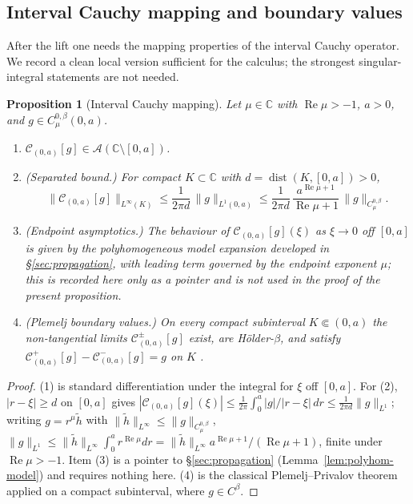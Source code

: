 \documentclass[pdflatex,sn-mathphys-num]{sn-jnl}%
\newcommand{\C}{\mathbb{C}}
\newcommand{\Cau}{\mathcal{C}}
\newcommand{\dist}{\operatorname{dist}}
\newcommand{\Real}{\operatorname{Re}}
\newcommand{\Ahol}{\mathcal{A}}
\theoremstyle{thmstyleone}
\newtheorem{proposition}[theorem]{Proposition}%
\theoremstyle{thmstyletwo}
\theoremstyle{thmstylethree}
\begin{document}
\subsection{Interval Cauchy mapping and boundary values}
After the lift one needs the mapping properties of the interval Cauchy operator.
We record a clean local version sufficient for the calculus; the strongest
singular-integral statements are not needed.

\begin{proposition}[Interval Cauchy mapping]\label{prop:interval-mapping}
Let $\mu\in\C$ with $\Real\mu>-1$, $a>0$, and $g\in C^{0,\beta}_{\mu}(0,a)$.
\begin{enumerate}
\item $\Cau_{(0,a)}[g]\in\Ahol(\C\setminus[0,a])$.
\item \textup{(Separated bound.)} For compact $K\subset\C$ with
$d=\dist(K,[0,a])>0$,
\[
  \bigl\|\Cau_{(0,a)}[g]\bigr\|_{L^\infty(K)}
  \le\frac{1}{2\pi d}\,\|g\|_{L^1(0,a)}
  \le\frac{1}{2\pi d}\,\frac{a^{\Real\mu+1}}{\Real\mu+1}\,
     \|g\|_{C^{0,\beta}_{\mu}} .
\]
\item \textup{(Endpoint asymptotics.)} The behaviour of $\Cau_{(0,a)}[g](\xi)$
as $\xi\to0$ off $[0,a]$ is given by the polyhomogeneous model expansion
developed in \S\ref{sec:propagation}, with leading term governed by the endpoint
exponent $\mu$; this is recorded here only as a pointer and is not used in the
proof of the present proposition.
\item \textup{(Plemelj boundary values.)} On every compact subinterval
$K\Subset(0,a)$ the non-tangential limits $\Cau_{(0,a)}^{\pm}[g]$ exist, are
H\"older-$\beta$, and satisfy
$\Cau_{(0,a)}^{+}[g]-\Cau_{(0,a)}^{-}[g]=g$ on $K$
\textup{\cite{muskhelishvili2008singular,gakhov2014boundary}}.
\end{enumerate}
\end{proposition}

\begin{proof}
(1) is standard differentiation under the integral for $\xi$ off $[0,a]$. For
(2), $|r-\xi|\ge d$ on $[0,a]$ gives
$|\Cau_{(0,a)}[g](\xi)|\le\frac{1}{2\pi}\int_0^a|g|/|r-\xi|\,dr
\le\frac{1}{2\pi d}\|g\|_{L^1}$; writing $g=r^{\mu}\tilde h$ with
$\|\tilde h\|_{L^\infty}\le\|g\|_{C^{0,\beta}_{\mu}}$,
$\|g\|_{L^1}\le\|\tilde h\|_{L^\infty}\int_0^a r^{\Real\mu}dr
=\|\tilde h\|_{L^\infty}a^{\Real\mu+1}/(\Real\mu+1)$, finite under
$\Real\mu>-1$. Item (3) is a pointer to \S\ref{sec:propagation}
(Lemma~\ref{lem:polyhom-model}) and requires nothing here. (4) is the classical
Plemelj--Privalov theorem applied on a compact subinterval, where
$g\in C^{\beta}$.
\end{proof}
\end{document}
